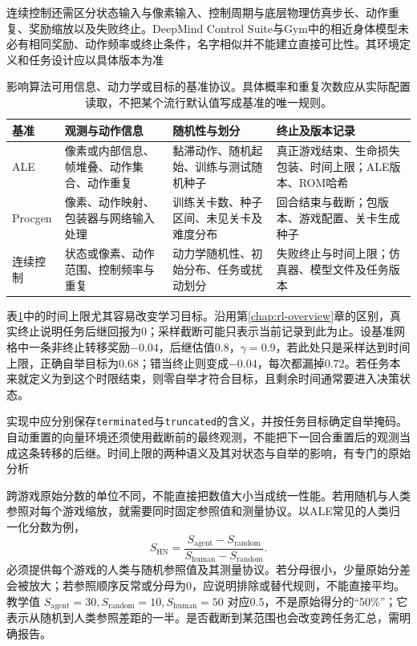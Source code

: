 连续控制还需区分状态输入与像素输入、控制周期与底层物理仿真步长、动作重复、奖励缩放以及失败终止。DeepMind Control Suite与Gym中的相近身体模型未必有相同奖励、动作频率或终止条件，名字相似并不能建立直接可比性。其环境定义和任务设计应以具体版本为准

\begin{table}[t]
  \centering
  \small
  \begin{tabularx}{\linewidth}{>{\raggedright\arraybackslash}p{21mm} >{\raggedright\arraybackslash}X >{\raggedright\arraybackslash}X >{\raggedright\arraybackslash}X}
    \toprule
    基准 & 观测与动作信息 & 随机性与划分 & 终止及版本记录 \\
    \midrule
    ALE & 像素或内部信息、帧堆叠、动作集合、动作重复 & 黏滞动作、随机起始、训练与测试随机种子 & 真正游戏结束、生命损失包装、时间上限；ALE版本、ROM哈希 \\
    Procgen & 像素、动作映射、包装器与网络输入处理 & 训练关卡数、种子区间、未见关卡及难度分布 & 回合结束与截断；包版本、游戏配置、关卡生成种子 \\
    连续控制 & 状态或像素、动作范围、控制频率与重复 & 动力学随机性、初始分布、任务或扰动划分 & 失败终止与时间上限；仿真器、模型文件及任务版本 \\
    \bottomrule
  \end{tabularx}
  \caption{影响算法可用信息、动力学或目标的基准协议。具体概率和重复次数应从实际配置读取，不把某个流行默认值写成基准的唯一规则。}
  \label{tab:rl-learning-benchmark-settings}
\end{table}

表\ref{tab:rl-learning-benchmark-settings}中的时间上限尤其容易改变学习目标。沿用第\ref{chap:rl-overview}章的区别，真实终止说明任务后继回报为0；采样截断可能只表示当前记录到此为止。设基准网格中一条非终止转移奖励$-0.04$，后继估值$0.8$，$\gamma=0.9$，若此处只是采样达到时间上限，正确自举目标为$0.68$；错当终止则变成$-0.04$，每次都漏掉$0.72$。若任务本来就定义为到这个时限结束，则零自举才符合目标，且剩余时间通常要进入决策状态。

实现中应分别保存\texttt{terminated}与\texttt{truncated}的含义，并按任务目标确定自举掩码。自动重置的向量环境还须使用截断前的最终观测，不能把下一回合重置后的观测当成这条转移的后继。时间上限的两种语义及其对状态与自举的影响，有专门的原始分析

跨游戏原始分数的单位不同，不能直接把数值大小当成统一性能。若用随机与人类参照对每个游戏缩放，就需要同时固定参照值和测量协议。以ALE常见的人类归一化分数为例，
\[
  S_{\mathrm{HN}}
   =\frac{S_{\mathrm{agent}}-S_{\mathrm{random}}}
          {S_{\mathrm{human}}-S_{\mathrm{random}}}.
\]
必须提供每个游戏的人类与随机参照值及其测量协议。若分母很小，少量原始分差会被放大；若参照顺序反常或分母为0，应说明排除或替代规则，不能直接平均。教学值
$S_{\mathrm{agent}}=30,S_{\mathrm{random}}=10,S_{\mathrm{human}}=50$
对应$0.5$，不是原始得分的“50\%”；它表示从随机到人类参照差距的一半。是否截断到某范围也会改变跨任务汇总，需明确报告。

